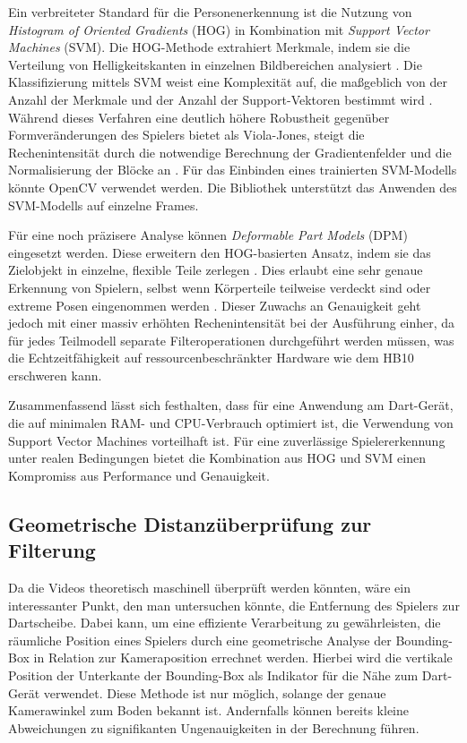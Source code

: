 Ein verbreiteter Standard für die Personenerkennung ist die Nutzung von \textit{Histogram of Oriented Gradients} (HOG) in Kombination mit \textit{Support Vector Machines} (SVM). Die HOG-Methode extrahiert Merkmale, 
indem sie die Verteilung von Helligkeitskanten in einzelnen Bildbereichen analysiert \parencite{tam_2023_extracting}. Die Klassifizierung mittels SVM weist eine Komplexität auf, die maßgeblich von der Anzahl der Merkmale und der Anzahl der Support-Vektoren 
bestimmt wird \parencite{_14}. Während dieses Verfahren eine deutlich höhere Robustheit gegenüber Formveränderungen des Spielers bietet als Viola-Jones, steigt die Rechenintensität durch die notwendige Berechnung der Gradientenfelder und die 
Normalisierung der Blöcke an \parencite{tam_2023_how}. Für das Einbinden eines trainierten SVM-Modells könnte OpenCV \parencite{opencv_library} verwendet werden. Die Bibliothek unterstützt das Anwenden des SVM-Modells auf einzelne Frames.\newline

Für eine noch präzisere Analyse können \textit{Deformable Part Models} (DPM) eingesetzt werden. Diese erweitern den HOG-basierten Ansatz, indem sie das Zielobjekt in einzelne, flexible Teile zerlegen \parencite{girshick_deformable}. Dies erlaubt eine sehr genaue 
Erkennung von Spielern, selbst wenn Körperteile teilweise verdeckt sind oder extreme Posen eingenommen werden \parencite{girshick_deformable}. Dieser Zuwachs an Genauigkeit geht jedoch mit einer massiv erhöhten Rechenintensität bei der Ausführung einher, 
da für jedes Teilmodell separate Filteroperationen durchgeführt werden müssen, was die Echtzeitfähigkeit auf ressourcenbeschränkter Hardware wie dem HB10 erschweren kann.\newline

Zusammenfassend lässt sich festhalten, dass für eine Anwendung am Dart-Gerät, die auf minimalen RAM- und CPU-Verbrauch optimiert ist, die Verwendung von Support Vector Machines vorteilhaft ist. Für eine zuverlässige 
Spielererkennung unter realen Bedingungen bietet die Kombination aus HOG und SVM einen Kompromiss aus Performance und Genauigkeit.

\subsection{Geometrische Distanzüberprüfung zur Filterung}

Da die Videos theoretisch maschinell überprüft werden könnten, wäre ein interessanter Punkt, den man untersuchen könnte, die Entfernung des Spielers zur Dartscheibe.
Dabei kann, um eine effiziente Verarbeitung zu gewährleisten, die räumliche Position eines Spielers durch eine geometrische Analyse der Bounding-Box in Relation zur Kameraposition errechnet werden.  
Hierbei wird die vertikale Position der Unterkante der Bounding-Box als Indikator für die Nähe zum Dart-Gerät verwendet. Diese Methode ist nur möglich, solange der genaue Kamerawinkel zum Boden bekannt ist.
Andernfalls können bereits kleine Abweichungen zu signifikanten Ungenauigkeiten in der Berechnung führen.\newline

